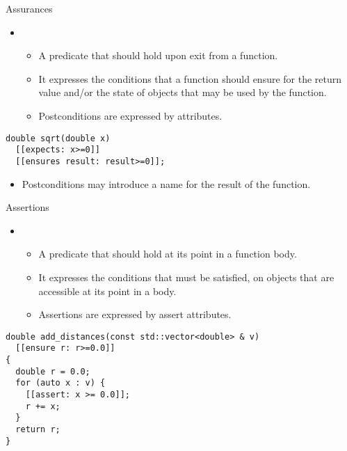 \begin{frame}[t,fragile]{Assurances}
\begin{itemize}
  \item {}
    \begin{itemize}
      \item A predicate that should hold upon exit from a function.
      \item It expresses the conditions that a function should ensure for the 
            return value and/or the state of objects that may be used by the 
            function.
      \item Postconditions are expressed by  attributes.
    \end{itemize}
\end{itemize}

\vfill\pause
\begin{lstlisting}
double sqrt(double x)
  [[expects: x>=0]]
  [[ensures result: result>=0]];
\end{lstlisting}

\vfill\pause
\begin{itemize}
  \item Postconditions may introduce a name for the result of the function.
\end{itemize}
\end{frame}

\begin{frame}[t,fragile]{Assertions}
\begin{itemize}
  \item {}
    \begin{itemize}
      \item A predicate that should hold at its point in a function body.
      \item It expresses the conditions that must be satisfied, on objects that
are accessible at its point in a body.
      \item Assertions are expressed by assert attributes.
    \end{itemize}
\end{itemize}

\vfill\pause
\begin{lstlisting}
double add_distances(const std::vector<double> & v) 
  [[ensure r: r>=0.0]]
{
  double r = 0.0;
  for (auto x : v) {
    [[assert: x >= 0.0]];
    r += x;
  }
  return r;
}
\end{lstlisting}
\end{frame}

